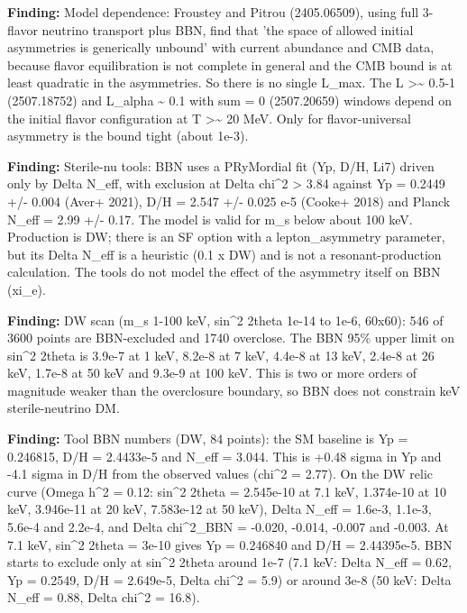 \documentclass[11pt,a4paper]{article}
\begin{document}
\textbf{Finding:} Model dependence: Froustey and Pitrou (2405.06509), using full 3-flavor neutrino transport plus BBN, find that 'the space of allowed initial asymmetries is generically unbound' with current abundance and CMB data, because flavor equilibration is not complete in general and the CMB bound is at least quadratic in the asymmetries. So there is no single L\_max. The L \textgreater{}\textasciitilde{} 0.5-1 (2507.18752) and \textbar{}L\_alpha\textbar{} \textasciitilde{} 0.1 with sum = 0 (2507.20659) windows depend on the initial flavor configuration at T \textgreater{}\textasciitilde{} 20 MeV. Only for flavor-universal asymmetry is the bound tight (about 1e-3).

\textbf{Finding:} Sterile-nu tools: BBN uses a PRyMordial fit (Yp, D/H, Li7) driven only by Delta N\_eff, with exclusion at Delta chi\textasciicircum{}2 \textgreater{} 3.84 against Yp = 0.2449 +/- 0.004 (Aver+ 2021), D/H = 2.547 +/- 0.025 e-5 (Cooke+ 2018) and Planck N\_eff = 2.99 +/- 0.17. The model is valid for m\_s below about 100 keV. Production is DW; there is an SF option with a lepton\_asymmetry parameter, but its Delta N\_eff is a heuristic (0.1 x DW) and is not a resonant-production calculation. The tools do not model the effect of the asymmetry itself on BBN (xi\_e).

\textbf{Finding:} DW scan (m\_s 1-100 keV, sin\textasciicircum{}2 2theta 1e-14 to 1e-6, 60x60): 546 of 3600 points are BBN-excluded and 1740 overclose. The BBN 95\% upper limit on sin\textasciicircum{}2 2theta is 3.9e-7 at 1 keV, 8.2e-8 at 7 keV, 4.4e-8 at 13 keV, 2.4e-8 at 26 keV, 1.7e-8 at 50 keV and 9.3e-9 at 100 keV. This is two or more orders of magnitude weaker than the overclosure boundary, so BBN does not constrain keV sterile-neutrino DM.

\textbf{Finding:} Tool BBN numbers (DW, 84 points): the SM baseline is Yp = 0.246815, D/H = 2.4433e-5 and N\_eff = 3.044. This is +0.48 sigma in Yp and -4.1 sigma in D/H from the observed values (chi\textasciicircum{}2 = 2.77). On the DW relic curve (Omega h\textasciicircum{}2 = 0.12: sin\textasciicircum{}2 2theta = 2.545e-10 at 7.1 keV, 1.374e-10 at 10 keV, 3.946e-11 at 20 keV, 7.583e-12 at 50 keV), Delta N\_eff = 1.6e-3, 1.1e-3, 5.6e-4 and 2.2e-4, and Delta chi\textasciicircum{}2\_BBN = -0.020, -0.014, -0.007 and -0.003. At 7.1 keV, sin\textasciicircum{}2 2theta = 3e-10 gives Yp = 0.246840 and D/H = 2.44395e-5. BBN starts to exclude only at sin\textasciicircum{}2 2theta around 1e-7 (7.1 keV: Delta N\_eff = 0.62, Yp = 0.2549, D/H = 2.649e-5, Delta chi\textasciicircum{}2 = 5.9) or around 3e-8 (50 keV: Delta N\_eff = 0.88, Delta chi\textasciicircum{}2 = 16.8).
\end{document}
